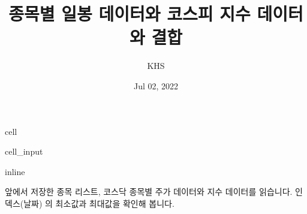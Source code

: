 \documentclass[letterpaper,10pt,english]{jupyterBook}
\title{종목별 일봉 데이터와 코스피 지수 데이터와 결합}
\date{Jul 02, 2022}
\author{KHS}
\begin{document}
\pagestyle{empty}
\sphinxmaketitle
\pagestyle{plain}
\sphinxtableofcontents
\pagestyle{normal}
\label{\detokenize{chapter4/4.4.3_Data_Collection::doc}}
\begin{sphinxuseclass}{cell}\begin{sphinxVerbatimInput}

\begin{sphinxuseclass}{cell_input}
\begin{sphinxVerbatim}[commandchars=\\\{\}]
   
 inline
   
   
   
  
\end{sphinxVerbatim}

\end{sphinxuseclass}\end{sphinxVerbatimInput}

\end{sphinxuseclass}


\sphinxAtStartPar
앞에서 저장한 종목 리스트, 코스닥 종목별 주가 데이터와 지수 데이터를 읽습니다. 인덱스(날짜) 의 최소값과 최대값을 확인해 봅니다.
\end{document}

